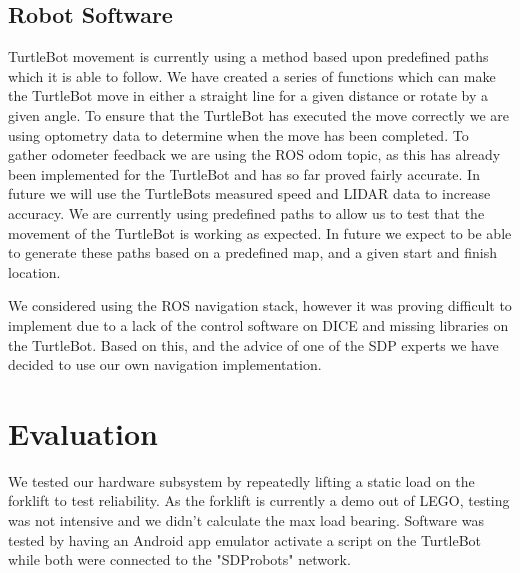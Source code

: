 \documentclass{article}
\begin{document}
\subsection{Robot Software}



TurtleBot movement is currently using a method based upon predefined paths which it is able to follow.
We have created a series of functions which can make the TurtleBot move in either a straight line for a given distance or rotate by a given angle.
To ensure that the TurtleBot has executed the move correctly we are using optometry data to determine when the move has been completed. 
To gather odometer feedback we are using the ROS odom topic, as this has already been implemented for the TurtleBot and has so far proved fairly accurate.
In future we will use the TurtleBots measured speed and LIDAR data to increase accuracy.
We are currently using predefined paths to allow us to test that the movement of the TurtleBot is working as expected. In future we expect to be able to generate these paths based on a predefined map, and a given start and finish location.

We considered using the ROS navigation stack, however it was proving difficult to implement due to a lack of the control software on DICE and missing libraries on the TurtleBot. 
Based on this, and the advice of one of the SDP experts we have decided to use our own navigation implementation.

\section{Evaluation}

We tested our hardware subsystem by repeatedly lifting a static load on the forklift to test reliability. As the forklift is currently a demo out of LEGO, testing was not intensive and we didn't calculate the max load bearing.
Software was tested by having an Android app emulator activate a script on the TurtleBot while both were connected to the "SDProbots" network.
\end{document}
